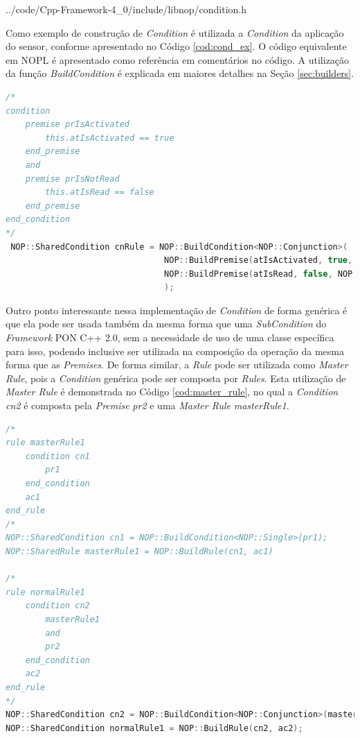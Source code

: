 
            {../code/Cpp-Framework-4_0/include/libnop/condition.h}

Como exemplo de construção de \textit{Condition} é utilizada a
\textit{Condition} da aplicação do sensor, conforme apresentado no Código
\ref{cod:cond_ex}. O código equivalente em NOPL é apresentado como referência em
comentários no código. A utilização da função \textit{BuildCondition} é
explicada em maiores detalhes na Seção \ref{sec:builders}.

\begin{lstlisting}[language=C++, float=htb,
caption = {Criação de \textit{Conditions} no \textit{Framework} PON C++ 4.0},
source = {Autoria própria},
label ={cod:cond_ex}]
/*
condition
    premise prIsActivated
        this.atIsActivated == true
    end_premise
    and
    premise prIsNotRead
        this.atIsRead == false
    end_premise
end_condition
*/
 NOP::SharedCondition cnRule = NOP::BuildCondition<NOP::Conjunction>(
                                NOP::BuildPremise(atIsActivated, true, NOP::Equal()),
                                NOP::BuildPremise(atIsRead, false, NOP::Equal())
                                );
\end{lstlisting}

Outro ponto interessante nessa implementação de \textit{Condition} de forma
genérica é que ela pode ser usada também da mesma forma que uma
\textit{SubCondition} do \textit{Framework} PON C++ 2.0, sem a necessidade de
uso de uma classe específica para isso, podendo inclusive ser utilizada na
composição da operação da mesma forma que as \textit{Premises}. De forma
similar, a \textit{Rule} pode ser utilizada como \textit{Master Rule}, pois a
\textit{Condition} genérica pode ser composta por \textit{Rules}. Esta
utilização de \textit{Master Rule} é demonstrada no Código
\ref{cod:master_rule}, no qual a \textit{Condition} \textit{cn2} é composta pela
\textit{Premise} \textit{pr2} e uma \textit{Master Rule} \textit{masterRule1}.

\begin{lstlisting}[language=C++, float=htb,
caption = {Utilização de \textit{Master Rule} em \textit{Conditions} no \textit{Framework} PON C++ 4.0},
source = {Autoria própria},
label ={cod:master_rule}]
/*
rule masterRule1
    condition cn1
        pr1
    end_condition
    ac1
end_rule
/*
NOP::SharedCondition cn1 = NOP::BuildCondition<NOP::Single>(pr1);
NOP::SharedRule masterRule1 = NOP::BuildRule(cn1, ac1)

/*
rule normalRule1
    condition cn2
        masterRule1
        and
        pr2
    end_condition
    ac2
end_rule
*/
NOP::SharedCondition cn2 = NOP::BuildCondition<NOP::Conjunction>(masterRule1, pr2);
NOP::SharedCondition normalRule1 = NOP::BuildRule(cn2, ac2);
\end{lstlisting}

